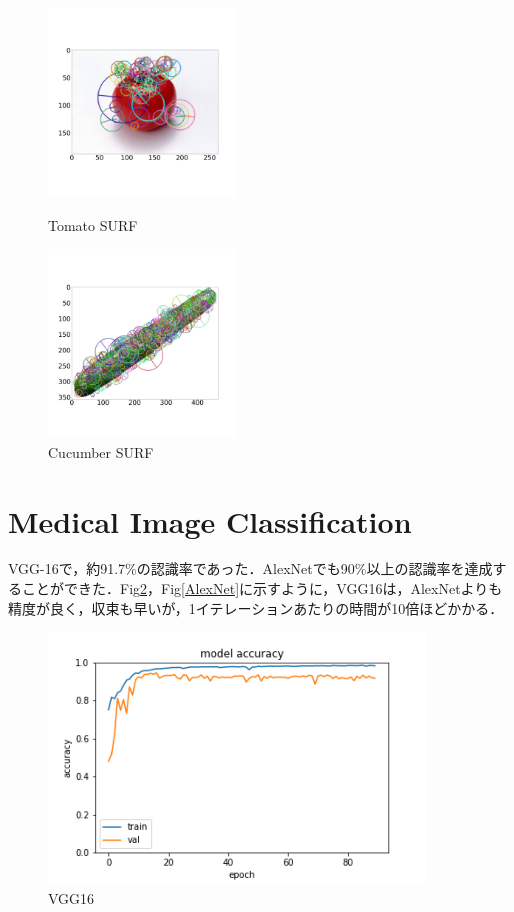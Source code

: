 \documentclass[11pt,a4j]{jarticle}
\begin{document}
\begin{figure}[ht]
	\begin{minipage}{0.5\hsize}
		\centering
		\includegraphics[width=5cm]{../1_BasicImageProcessing/output/tomato_surf.jpg}
		\vspace{-1cm}
		\renewcommand{\figurename}{Fig}
		\caption{Tomato SURF}
		\label{tomato_surf}
	\end{minipage}
	\begin{minipage}{0.5\hsize}
		\centering
		\includegraphics[width=5cm]{../1_BasicImageProcessing/output/cucumber_surf.jpg}
		\vspace{-1cm}
		\renewcommand{\figurename}{Fig}
		\caption{Cucumber SURF}
		\label{cucumber_surf}
	\end{minipage}
\end{figure}

\section{Medical Image Classification}
VGG-16で，約91.7\%の認識率であった．AlexNetでも90\%以上の認識率を達成することができた．Fig\ref{VGG16}，Fig\ref{AlexNet}に示すように，VGG16は，AlexNetよりも精度が良く，収束も早いが，1イテレーションあたりの時間が10倍ほどかかる．

\begin{figure}[ht]
	\centering
	\includegraphics[width=10cm]{../2_MedicalImageClassification/Model/VGG16_acc.png}
	\vspace{-0.5cm}
	\renewcommand{\figurename}{Fig}
	\caption{VGG16}
	\label{VGG16}
\end{figure}
\end{document}
